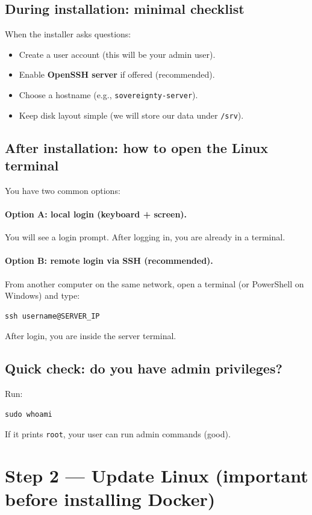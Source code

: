 \subsection{During installation: minimal checklist}
When the installer asks questions:
\begin{itemize}[leftmargin=*]
  \item Create a user account (this will be your admin user).
  \item Enable \textbf{OpenSSH server} if offered (recommended).
  \item Choose a hostname (e.g., \texttt{sovereignty-server}).
  \item Keep disk layout simple (we will store our data under \texttt{/srv}).
\end{itemize}

\subsection{After installation: how to open the Linux terminal}
You have two common options:

\paragraph{Option A: local login (keyboard + screen).}
You will see a login prompt. After logging in, you are already in a terminal.

\paragraph{Option B: remote login via SSH (recommended).}
From another computer on the same network, open a terminal (or PowerShell on Windows) and type:
\begin{lstlisting}
ssh username@SERVER_IP
\end{lstlisting}
After login, you are inside the server terminal.

\subsection{Quick check: do you have admin privileges?}
Run:
\begin{lstlisting}
sudo whoami
\end{lstlisting}
If it prints \texttt{root}, your user can run admin commands (good).

\section{Step 2 --- Update Linux (important before installing Docker)}

